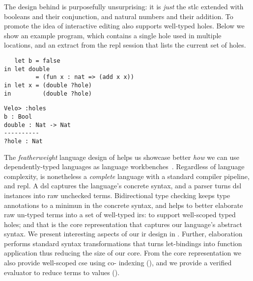 The design behind \Velo{} is purposefully unsurprising:
%
it is \emph{just} the \ac{stlc} extended with booleans and their conjunction, and natural numbers and their addition.
%
To promote the idea of interactive editing \Velo{} also supports well-typed holes.
%
Below we show an example \Velo{} program, which contains a single hole used in multiple locations, and an extract from the \acs*{repl}
session that lists the current set of holes.

\begin{center}
  \begin{minipage}[t]{0.45\linewidth}
\begin{Verbatim}
   let b = false
in let double
         = (fun x : nat => (add x x))
in let x = (double ?hole)
in         (double ?hole)
\end{Verbatim}
\end{minipage}
\hfill
  \begin{minipage}[t]{0.45\linewidth}
    \begin{Verbatim}
Velo> :holes
b : Bool
double : Nat -> Nat
----------
?hole : Nat
\end{Verbatim}
\end{minipage}

\end{center}

The \emph{featherweight} language design of \Velo{} helps us showcase better \emph{how} we can use dependently-typed languages as language workbenches~\cite{DBLP:journals/toplas/IgarashiPW01}.
%
Regardless of language complexity, \Velo{} is nonetheless a \emph{complete} language with a standard compiler pipeline, and \acs*{repl}.
%
A \ac{dsl} captures the language's concrete syntax, and a parser turns \ac{dsl} instances into raw unchecked terms.
%
Bidirectional type checking keeps type annotations to a minimun in the concrete syntax, and helps to better elaborate raw un-typed terms into a set of well-typed \acp{ir}:
%
 to support well-scoped typed holes;
%
and
%
 that is the core representation that captures our language's abstract syntax.
%
We present interesting aspects of our \ac{ir} design in .
%
Further, elaboration performs standard syntax transformations that turns let-bindings into function application thus reducing the size of our core.
%
From the core representation we also provide well-scoped \ac{cse} using co-\DeBruijn{} indexing (), and we provide a verified evaluator to reduce terms to values ().



